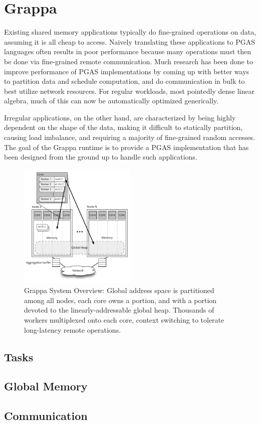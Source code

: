 \section{Grappa}
Existing shared memory applications typically do fine-grained operations on data, assuming it is all cheap to access.
Naively translating these applications to PGAS languages often results in poor performance because many operations must then be done via fine-grained remote communication.
Much research has been done to improve performance of PGAS implementations by coming up with better ways to partition data and schedule computation, and do communication in bulk to best utilize network resources.
For regular workloads, most pointedly dense linear algebra, much of this can now be automatically optimized generically.

Irregular applications, on the other hand, are characterized by being highly dependent on the shape of the data, making it difficult to statically partition, causing load imbalance, and requiring a majority of fine-grained random accesses. The goal of the Grappa runtime is to provide a PGAS implementation that has been designed from the ground up to handle such applications.

\begin{figure}[ht]
  \centering
  \includegraphics[width=0.5\textwidth]{figs/grappa_system.pdf}
  \caption{Grappa System Overview: Global address space is partitioned among all nodes, each core owns a portion, and with a portion devoted to the linearly-addressable global heap. Thousands of workers multiplexed onto each core, context switching to tolerate long-latency remote operations.}
  \label{fig:system}
\end{figure}

\subsection{Tasks}

\subsection{Global Memory}

\subsection{Communication}
